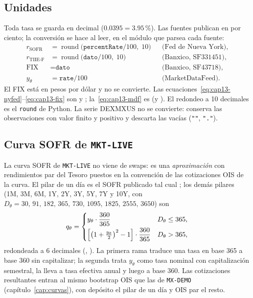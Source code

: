 \begin{sloppypar}
\subsection{Unidades}\label{sec:cap13-unidades}

Toda tasa se guarda en decimal ($0.0395=3.95\,\%$). Las fuentes publican en por ciento; la conversión se hace
al leer, en el módulo que parsea cada fuente:
\begin{align}
  r_{\text{SOFR}} &= \operatorname{round}\!\bigl(\texttt{percentRate}/100,\;10\bigr)
    && \text{(Fed de Nueva York)}, \label{eq:cap13-nyfed}\\
  r_{\text{TIIE-F}} &= \operatorname{round}\!\bigl(\texttt{dato}/100,\;10\bigr)
    && \text{(Banxico, SF331451)}, \label{eq:cap13-banxico}\\
  \text{FIX} &= \texttt{dato}
    && \text{(Banxico, SF43718)}, \label{eq:cap13-fix}\\
  y_\theta &= \texttt{rate}/100
    && \text{(MarketDataFeed)}. \label{eq:cap13-mdf}
\end{align}
El FIX está en pesos por dólar y no se convierte. Las ecuaciones~\eqref{eq:cap13-nyfed}--\eqref{eq:cap13-fix} son  y
; la~\eqref{eq:cap13-mdf} es
 (y ). El
redondeo a 10 decimales es el \texttt{round} de Python. La serie DEXMXUS no se convierte:
 conserva las observaciones con valor finito y positivo y descarta las
vacías (\texttt{""}, \texttt{"."}).

\subsection{Curva SOFR de \texttt{MKT-LIVE}}\label{sec:cap13-curva}

La curva SOFR de \texttt{MKT-LIVE} no viene de swaps: es una \emph{aproximación} con rendimientos par del
Tesoro \citep{treasury2026} puestos en la convención de las cotizaciones OIS de la curva. El pilar de un día
es el SOFR publicado tal cual \citep{nyfed2026}; los demás pilares (1M, 3M, 6M, 1Y, 2Y, 3Y, 5Y, 7Y y 10Y, con
$D_\theta=30,\,91,\,182,\,365,\,730,\,1095,\,1825,\,2555,\,3650$) son
\begin{equation}\label{eq:cap13-tesoro}
  q_\theta=\begin{cases}
    y_\theta\cdot\dfrac{360}{365} & D_\theta\le 365,\\[1.2ex]
    \Bigl[\bigl(1+\tfrac{y_\theta}{2}\bigr)^{2}-1\Bigr]\cdot\dfrac{360}{365} & D_\theta>365,
  \end{cases}
\end{equation}
redondeada a 6 decimales (,
). La primera rama traduce una tasa en base 365 a base 360 sin
capitalizar; la segunda trata $y_\theta$ como tasa nominal con capitalización semestral, la lleva a tasa
efectiva anual y luego a base 360. Las cotizaciones resultantes entran al mismo bootstrap OIS que las de
\texttt{MX-DEMO} (capítulo~\ref{cap:curvas}), con depósito el pilar de un día y OIS par el resto.


\end{sloppypar}
